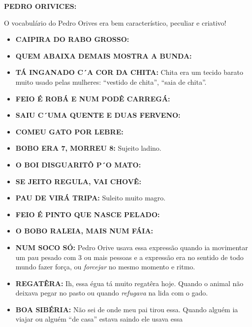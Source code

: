 \documentclass[12pt,brazil,]{book}
\providecommand{\tightlist}{%
  \setlength{\itemsep}{0pt}\setlength{\parskip}{0pt}}
\begin{document}
\textbf{PEDRO ORIVICES:}

O vocabulário do Pedro Orives era bem característico, peculiar e
criativo!

\begin{itemize}
\tightlist
\item
  \textbf{CAIPIRA DO RABO GROSSO:}\\
\item
  \textbf{QUEM ABAIXA DEMAIS MOSTRA A BUNDA:}\\
\item
  \textbf{TÁ INGANADO C´A COR DA CHITA:} Chita era um tecido barato
  muito usado pelas mulheres: ``vestido de chita'', ``saia de chita''.\\
\item
  \textbf{FEIO É ROBÁ E NUM PODÊ CARREGÁ:}\\
\item
  \textbf{SAIU C´UMA QUENTE E DUAS FERVENO:}\\
\item
  \textbf{COMEU GATO POR LEBRE:}\\
\item
  \textbf{BOBO ERA 7, MORREU 8:} Sujeito ladino.\\
\item
  \textbf{O BOI DISGUARITÔ P´O MATO:}\\
\item
  \textbf{SE JEITO REGULA, VAI CHOVÊ:}\\
\item
  \textbf{PAU DE VIRÁ TRIPA:} Suleito muito magro.\\
\item
  \textbf{FEIO É PINTO QUE NASCE PELADO:}\\
\item
  \textbf{O BOBO RALEIA, MAIS NUM FÁIA:}\\
\item
  \textbf{NUM SOCO SÓ:} Pedro Orive usava essa expressão quando ia
  movimentar um pau pesado com 3 ou mais pessoas e a expressão era no
  sentido de todo mundo fazer força, ou \emph{forcejar} no mesmo momento
  e ritmo.\\
\item
  \textbf{REGATÊRA:} Ih, essa égua tá muito regatêra hoje. Quando o
  animal não deixava pegar no pasto ou quando \emph{refugava} na lida
  com o gado.\\
\item
  \textbf{BOA SIBÉRIA:} Não sei de onde meu pai tirou essa. Quando
  alguém ia viajar ou alguém ``de casa'' estava saindo ele usava essa

\end{itemize}
\end{document}
